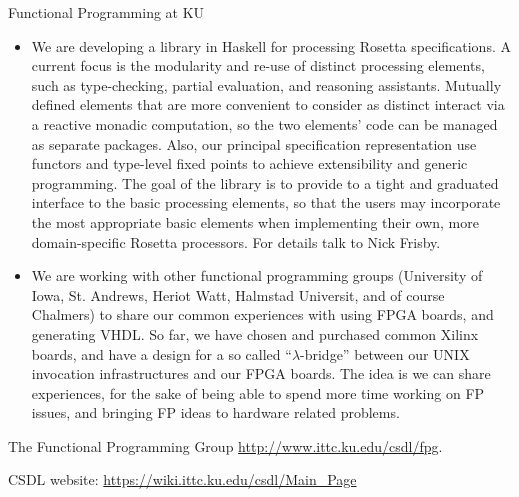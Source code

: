 \documentclass{article}
\begin{document}
\begin{hcarentry}{Functional Programming at KU}
\begin{itemize}
\item We are developing a library in Haskell for processing Rosetta specifications.
A current focus is the modularity and re-use of distinct processing
elements, such as type-checking, partial evaluation, and reasoning
assistants. Mutually defined elements that are more convenient to
consider as distinct interact via a reactive monadic computation, so
the two elements' code can be managed as separate packages. Also, our
principal specification representation use functors and type-level
fixed points to achieve extensibility and generic programming. The
goal of the library is to provide to a tight and graduated interface
to the basic processing elements, so that the users may incorporate
the most appropriate basic elements when implementing their own, more
domain-specific Rosetta processors. For details talk to Nick Frisby.

\item We are working with other functional programming groups (University of Iowa, St. Andrews, Heriot Watt, Halmstad Universit, and of course Chalmers) to share our common experiences with using FPGA boards, and generating VHDL.
So far, we have chosen and purchased common Xilinx boards, and have a design for a so called ``$\lambda$-bridge'' between our UNIX invocation infrastructures and our FPGA boards. The idea is we can share experiences, for the sake of 
being able to spend more time working on FP issues, and bringing FP ideas to hardware related problems.
\end{itemize}

\FurtherReading
  The Functional Programming Group
    \url{http://www.ittc.ku.edu/csdl/fpg}.

  CSDL website: \url{https://wiki.ittc.ku.edu/csdl/Main_Page}
\end{hcarentry}
\end{document}
